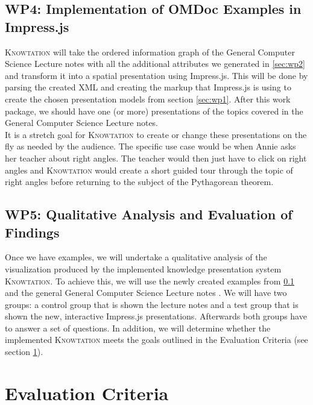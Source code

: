 \documentclass[twoside]{article}
\newcommand{\sys}{\textsc{Knowtation}\xspace}
\begin{document}
\subsection{WP4: Implementation of OMDoc Examples in Impress.js}
\label{sec:wp4}

\sys will take the ordered information graph of the General Computer Science Lecture notes \cite{Kohlhase:GenCSI:base} with all the additional attributes we generated in \ref{sec:wp2} and transform it into a spatial presentation using Impress.js. This will be done by parsing the created XML and creating the markup that Impress.js is using to create the chosen presentation models from section \ref{sec:wp1}. After this work package, we should have one (or more) presentations of the topics covered in the General Computer Science Lecture notes.\\

It is a stretch goal for \sys to create or change these presentations on the fly as needed by the audience. The specific use case would be when Annie asks her teacher about right angles. The teacher would then just have to click on right angles and \sys would create a short guided tour through the topic of right angles before returning to the subject of the Pythagorean theorem.\\

\subsection{WP5: Qualitative Analysis and Evaluation of Findings}
\label{sec:wp5}

Once we have examples, we will undertake a qualitative analysis of the visualization produced by the implemented knowledge presentation system \sys . To achieve this, we will use the newly created examples from \ref{sec:wp4} and the general General Computer Science Lecture notes \cite{Kohlhase:GenCSI:base}. We will have two groups: a control group that is shown the lecture notes and a test group that is shown the new, interactive Impress.js presentations. Afterwards both groups have to answer a set of questions. In addition, we will determine whether the implemented \sys meets the goals outlined in the Evaluation Criteria (see section \ref{sec:evalcriteria}).\\

\section{Evaluation Criteria}
\label{sec:evalcriteria}
\end{document}
